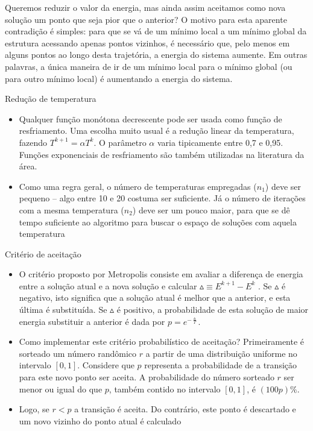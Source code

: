 \documentclass{beamer}
\begin{document}
\begin{frame}
    Queremos reduzir o valor da energia, mas ainda assim aceitamos como nova solução um
ponto que seja pior que o anterior? O motivo para esta aparente contradição é simples: para que se
vá de um mínimo local a um mínimo global da estrutura acessando apenas pontos vizinhos, é
necessário que, pelo menos em alguns pontos ao longo desta trajetória, a energia do sistema
aumente. Em outras palavras, a única maneira de ir de um mínimo local para o mínimo global (ou
para outro mínimo local) é aumentando a energia do sistema.
\end{frame}

\begin{frame}{Redução de temperatura}
    \begin{itemize}
        \item Qualquer função monótona decrescente pode ser usada como função de resfriamento. Uma
        escolha muito usual é a redução linear da temperatura, fazendo $T^{k+1} = \alpha T^k$. O parâmetro $\alpha$ varia tipicamente entre 0,7 e 0,95. Funções exponenciais de resfriamento são também utilizadas na
        literatura da área.
        \item Como uma regra geral, o número de temperaturas
        empregadas ($n_1$) deve ser pequeno – algo entre 10 e 20 costuma ser suficiente. Já o número de
        iterações com a mesma temperatura ($n_2$) deve ser um pouco maior, para que se dê tempo suficiente
        ao algoritmo para buscar o espaço de soluções com aquela temperatura
    \end{itemize}
\end{frame}

\begin{frame}{Critério de aceitação}
    \begin{itemize}
        \item O critério proposto por Metropolis consiste em avaliar a diferença de energia entre a solução
        atual e a nova solução e calcular $\vartriangle \equiv E^{k+1} -E^k$ . Se $\vartriangle$ é negativo, isto significa que a solução atual é
        melhor que a anterior, e esta última é substituída. Se $\vartriangle$ é positivo, a probabilidade de esta solução de
        maior energia substituir a anterior é dada por $p = e ^ {-\frac{\vartriangle}{T}}$.\\
        \item Como implementar este critério probabilístico de aceitação? Primeiramente é sorteado um
        número randômico $r$ a partir de uma distribuição uniforme no intervalo $[0,1]$. Considere que $p$
        representa a probabilidade de a transição para este novo ponto ser aceita. A probabilidade do
        número sorteado $r$ ser menor ou igual do que $p$, também contido no intervalo $[0,1]$, é $(100p)\%$.
        \item  Logo, se $r < p$ a transição é aceita. Do contrário, este ponto é descartado e um novo vizinho do ponto atual é calculado
    \end{itemize}
\end{frame}
\end{document}
